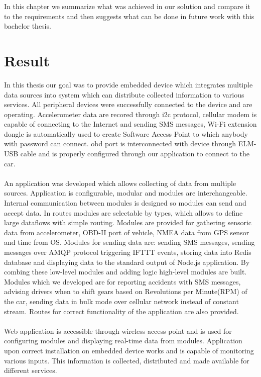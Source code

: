 In this chapter we summarize what was achieved in our solution and compare it to the requirements and then suggests what can be done in future work with this bachelor thesis.
\section{Result} %
\label{sec:result}
In this thesis our goal was to provide embedded device which integrates multiple data sources into system which can distribute collected information to various services. All peripheral devices were successfully connected to the device and are operating. Accelerometer data are recored through \gls{i2c} protocol, cellular modem is capable of connecting to the Internet and sending SMS messages, Wi-Fi extension dongle is automatically used to create Software Access Point to which anybody with password can connect. \gls{obd} port is interconnected with device through ELM-USB cable and is properly configured through our application to connect to the car.\\\\
An application was developed which allows collecting of data from multiple sources. Application is configurable, modular and modules are interchangeable. Internal communication between modules is designed so modules can send and accept data. In routes modules are selectable by types, which allows to define large dataflows with simple routing. Modules are provided for gathering sensoric data from accelerometer, OBD-II port of vehicle, NMEA data from GPS sensor and time from OS. Modules for sending data are: sending SMS messages, sending messages over AMQP protocol triggering IFTTT events, storing data into Redis database and displaying data to the standard output of Node.js application. By combing these low-level modules and adding logic high-level modules are built. Modules which we developed are for reporting accidents with SMS messages, advising drivers when to shift gears based on Revolutions per Minute(RPM) of the car, sending data in bulk mode over cellular network instead of constant stream. Routes for correct functionality of the application are also provided.\\\\
Web application is accessible through wireless access point and is used for configuring modules and displaying real-time data from modules. Application upon correct installation on embedded device works and is capable of monitoring various inputs. This information is collected, distributed and made available for different services.\\\\
